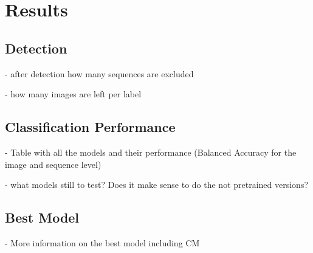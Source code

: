 

\section{Results}
\label{results}

    \subsection{Detection}

    - after detection how many sequences are excluded

    - how many images are left per label

    \subsection{Classification Performance}

    - Table with all the models and their performance (Balanced Accuracy for the image and sequence level)

    - what models still to test? Does it make sense to do the not pretrained versions?

    \subsection{Best Model}

    - More information on the best model including CM